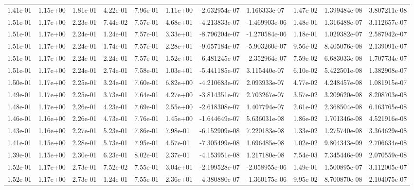 \begin{longtable}{| p{} | p{} |}
1.41e-01 & 1.15e+00 & 1.81e-01 & 4.22e-01 & 7.96e-01 & 1.11e+00 & -2.632954e-07 &  1.166333e-07 &  1.47e-02 &  1.399484e-08 &  3.807211e-08 \\
1.51e-01 & 1.17e+00 & 2.23e-01 & 7.44e-02 & 7.57e-01 & 4.68e+01 & -4.213833e-07 & -1.469903e-06 &  1.48e-01 &  1.316488e-07 &  3.112657e-07 \\
1.51e-01 & 1.17e+00 & 2.24e-01 & 1.24e-01 & 7.57e-01 & 3.33e+01 & -8.796204e-07 & -1.270584e-06 &  1.18e-01 &  1.029382e-07 &  2.587942e-07 \\
1.51e-01 & 1.17e+00 & 2.24e-01 & 1.74e-01 & 7.57e-01 & 2.28e+01 & -9.657184e-07 & -5.903260e-07 &  9.56e-02 &  8.405076e-08 &  2.139091e-07 \\
1.51e-01 & 1.17e+00 & 2.24e-01 & 2.24e-01 & 7.57e-01 & 1.52e+01 & -6.481245e-07 & -2.352964e-07 &  7.59e-02 &  6.683033e-08 &  1.707734e-07 \\
1.51e-01 & 1.17e+00 & 2.24e-01 & 2.74e-01 & 7.58e-01 & 1.03e+01 & -5.441185e-07 &  3.115440e-07 &  6.10e-02 &  5.422501e-08 &  1.382908e-07 \\
1.50e-01 & 1.17e+00 & 2.25e-01 & 3.24e-01 & 7.60e-01 & 6.82e+00 & -4.210683e-07 &  2.093933e-07 &  4.77e-02 &  4.248457e-08 &  1.081915e-07 \\
1.49e-01 & 1.17e+00 & 2.25e-01 & 3.73e-01 & 7.64e-01 & 4.27e+00 & -3.814351e-07 &  2.703267e-07 &  3.57e-02 &  3.209620e-08 &  8.208703e-08 \\
1.48e-01 & 1.17e+00 & 2.26e-01 & 4.23e-01 & 7.69e-01 & 2.55e+00 & -2.618308e-07 &  1.407794e-07 &  2.61e-02 &  2.368504e-08 &  6.163765e-08 \\
1.46e-01 & 1.16e+00 & 2.26e-01 & 4.73e-01 & 7.76e-01 & 1.45e+00 & -1.644649e-07 &  5.636031e-08 &  1.86e-02 &  1.701346e-08 &  4.521916e-08 \\
1.43e-01 & 1.16e+00 & 2.27e-01 & 5.23e-01 & 7.86e-01 & 7.98e-01 & -6.152909e-08 &  7.220183e-08 &  1.33e-02 &  1.275740e-08 &  3.364629e-08 \\
1.41e-01 & 1.15e+00 & 2.28e-01 & 5.73e-01 & 7.95e-01 & 4.57e-01 & -7.305499e-08 &  1.696485e-08 &  1.02e-02 &  9.804343e-09 &  2.706634e-08 \\
1.39e-01 & 1.15e+00 & 2.30e-01 & 6.23e-01 & 8.02e-01 & 2.37e-01 & -4.153951e-08 &  1.217180e-08 &  7.54e-03 &  7.345446e-09 &  2.070559e-08 \\
1.52e-01 & 1.17e+00 & 2.73e-01 & 7.52e-02 & 7.55e-01 & 3.04e+01 & -2.199528e-07 & -2.058955e-06 &  1.49e-01 &  1.500895e-07 &  3.112005e-07 \\
1.52e-01 & 1.17e+00 & 2.73e-01 & 1.24e-01 & 7.55e-01 & 2.36e+01 & -4.380880e-07 & -1.360175e-06 &  9.95e-02 &  8.700870e-08 &  2.104075e-07 \\

\end{longtable}
